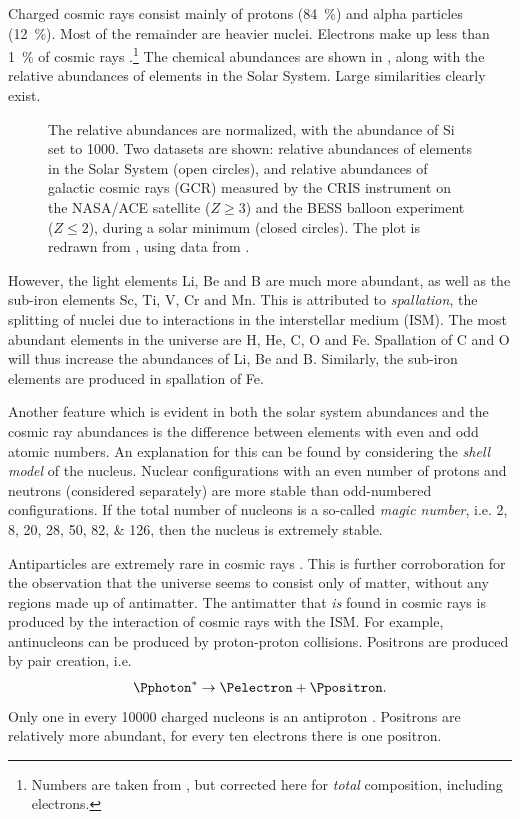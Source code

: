 Charged cosmic rays consist mainly of protons (\SI{84}{\percent}) and alpha
particles (\SI{12}{\percent}). Most of the remainder are heavier nuclei.
Electrons make up less than \SI{1}{\percent} of cosmic rays
\parencite{Grupen:2005}.\footnote{Numbers are taken from \textcite[78,
84]{Grupen:2005}, but corrected here for \emph{total} composition, including
electrons.}  The chemical abundances are shown in
, along with the relative abundances of elements in the
Solar System.  Large similarities clearly exist.
\begin{figure}
\centering
{

}
\caption{  The relative abundances are normalized, with the abundance of Si
set to \num{1000}.  Two datasets are shown: relative abundances
of elements in the Solar System (open circles), and relative abundances of
galactic cosmic rays (GCR) measured by the CRIS instrument on the NASA/ACE
satellite ($Z \geq 3$) and the BESS balloon experiment ($Z \leq 2$),
during a solar minimum (closed circles).  The plot is redrawn from
\cite{George:2009}, using data from
\cites{George:2009}{Lodders:2009}{Wang:2002}{deNolfo:2006}.}
\label{fig:composition}
\end{figure}
However, the light elements Li, Be and B are much more abundant, as well as the
sub-iron elements Sc, Ti, V, Cr and Mn.  This is attributed to
\emph{spallation}, the splitting of nuclei due to interactions in the
interstellar medium (ISM).  The most abundant elements in the universe are H,
He, C, O and Fe.  Spallation of C and O will thus increase the abundances of Li,
Be and B.  Similarly, the sub-iron elements are produced in spallation of Fe.

Another feature which is evident in both the solar system abundances and the
cosmic ray abundances is the difference between elements with even and odd
atomic numbers.  An explanation for this can be found by considering the
\emph{shell model} of the nucleus.  Nuclear configurations with an even number
of protons and neutrons (considered separately) are more stable than
odd-numbered configurations.  If the total number of nucleons is a so-called
\emph{magic number}, i.e.
\numlist[list-final-separator={ or }]{2;8;20;28;50;82;126}, then the nucleus is
extremely stable.

Antiparticles are extremely rare in cosmic rays
\parencites{Smoot:1975}{Picozza:2003}. This is further corroboration for the
observation that the universe seems to consist only of matter, without any
regions made up of antimatter.  The antimatter that \emph{is} found in
cosmic rays is produced by the interaction of cosmic rays with the ISM.  For
example, antinucleons can be produced by proton-proton collisions.
Positrons are produced by pair creation, i.e.
\begin{equation}
\Pphoton^* \to \Pelectron + \Ppositron.
\end{equation}
Only one in every \num{10000} charged nucleons is an antiproton
\parencite{Picozza:2003}. Positrons are relatively more abundant, for every
ten electrons there is one positron.

